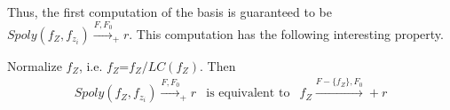 Thus, the first computation of the \Grobner basis is guaranteed to be 
$Spoly(f_Z,f_{z_i})\xrightarrow{F,F_0}_+ r$.
This computation has the following interesting property.

\begin{Proposition} \label{prop:reduce}
Normalize $f_Z$, i.e. $f_Z$=$f_Z/LC(f_Z)$. Then
\begin{eqnarray}
Spoly(f_Z,f_{z_i})\xrightarrow{F,F_0}_+ r & \text{is equivalent to} &
f_Z\xrightarrow{F-\{f_Z\},F_0} + r
\end{eqnarray}
\end{Proposition}


